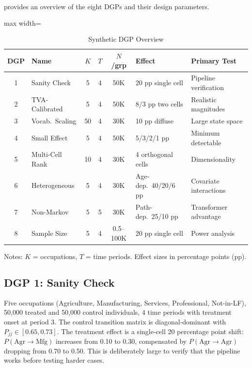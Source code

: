 \documentclass[12pt]{article}
\begin{document}
 provides an overview of the eight DGPs and their design parameters.

\begin{table}[H]
\centering
\caption{Synthetic DGP Overview}
\label{tab:dgp_overview}
\footnotesize
\begin{threeparttable}
\begin{adjustbox}{max width=\textwidth}
\begin{tabular}{clcccll}
\toprule
DGP & Name & $K$ & $T$ & $N$/grp & Effect & Primary Test \\
\midrule
1 & Sanity Check & 5 & 4 & 50K & 20 pp single cell & Pipeline verification \\
2 & TVA-Calibrated & 5 & 4 & 50K & 8/3 pp two cells & Realistic magnitudes \\
3 & Vocab.\ Scaling & 50 & 4 & 30K & 10 pp diffuse & Large state space \\
4 & Small Effect & 5 & 4 & 50K & 5/3/2/1 pp & Minimum detectable \\
5 & Multi-Cell Rank & 10 & 4 & 30K & 4 orthogonal cells & Dimensionality \\
6 & Heterogeneous & 5 & 4 & 30K & Age-dep.\ 40/20/6 pp & Covariate interactions \\
7 & Non-Markov & 5 & 5 & 30K & Path-dep.\ 25/10 pp & Transformer advantage \\
8 & Sample Size & 5 & 4 & 0.5--100K & 20 pp single cell & Power analysis \\
\bottomrule
\end{tabular}
\end{adjustbox}
\begin{tablenotes}[flushleft]
\small
\item Notes: $K$ = occupations, $T$ = time periods. Effect sizes in percentage points (pp).
\end{tablenotes}
\end{threeparttable}
\end{table}

\subsection{DGP 1: Sanity Check}

Five occupations (Agriculture, Manufacturing, Services, Professional, Not-in-LF), 50,000 treated and 50,000 control individuals, 4 time periods with treatment onset at period 3. The control transition matrix is diagonal-dominant with $P_{jj} \in [0.65, 0.73]$. The treatment effect is a single-cell 20 percentage point shift: $P(\text{Agr} \to \text{Mfg})$ increases from 0.10 to 0.30, compensated by $P(\text{Agr} \to \text{Agr})$ dropping from 0.70 to 0.50. This is deliberately large to verify that the pipeline works before testing harder cases.
\end{document}
